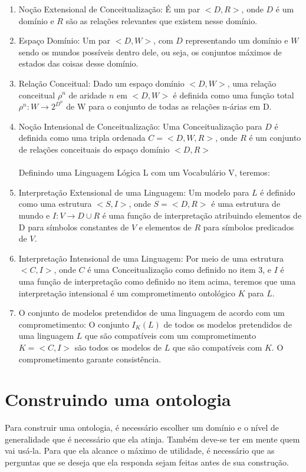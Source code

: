 \begin{enumerate}
	\item Noção Extensional de Conceitualização: É um par $<D,R>$, onde $D$ é um domínio e $R$ são as relações relevantes que existem nesse domínio.
	\item Espaço Domínio: Um par $<D,W>$, com $ D $ representando um domínio e $ W $ sendo os mundos possíveis dentro dele, ou seja, os conjuntos máximos de estados das coisas desse domínio.
	\item Relação Conceitual: Dado um espaço domínio $ <D,W> $, uma relação conceitual $ \rho^n $ de aridade $ n $ em $ <D,W> $ é definida como uma função total $ \rho^n : W \to 2^{D^n}$ de W para o conjunto de todas as relações n-árias em D.
	\item Noção Intensional de Conceitualização: Uma Conceitualização para $ D $ é definida como uma tripla ordenada $ C=<D,W,R> $, onde $ R $ é um conjunto de relações conceituais do espaço domínio $ <D,R> $ \\ \\
	Definindo uma Linguagem Lógica L com um Vocabulário V, teremos:
	\item Interpretação Extensional de uma Linguagem: Um modelo para $ L $ é definido como uma estrutura $ <S,I> $, onde $ S=<D,R> $ é uma estrutura de mundo e $ I : V \to D \cup R $ é uma função de interpretação atribuindo elementos de D para símbolos constantes de $ V $ e elementos de $ R $ para símbolos predicados de $ V $.
	\item Interpretação Intensional de uma Linguagem: Por meio de uma estrutura $ <C, I> $, onde $ C $ é uma Conceitualização como definido no item 3, e $ I $ é uma função de interpretação como definido no item acima, teremos que uma interpretação intensional é um comprometimento ontológico $ K $ para $ L $. 
	\item O conjunto de modelos pretendidos de uma linguagem de acordo com um comprometimento: O conjunto $ I_K(L) $ de todos os modelos pretendidos de uma linguagem $ L $ que são compatíveis com um comprometimento $ K = <C,I> $ são todos os modelos de $ L $ que são compatíveis com $ K $. O comprometimento garante consistência.
\end{enumerate}

\section{Construindo uma ontologia}

Para construir uma ontologia, é necessário escolher um domínio e o nível de generalidade que é necessário que ela atinja. Também deve-se ter em mente quem vai usá-la. Para que ela alcance o máximo de utilidade, é necessário que as perguntas que se deseja que ela responda sejam feitas antes de sua construção.

